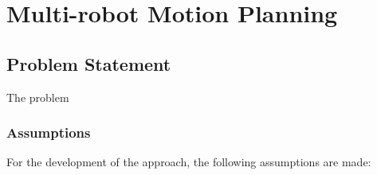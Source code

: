 
\chapter{Multi-robot Motion Planning}
\let\cleardoublepage\savecleardoublepage

\section{Problem Statement}\label{sec:problem}

The problem

\subsection{Assumptions}
For the development of the approach, the following assumptions are made:

